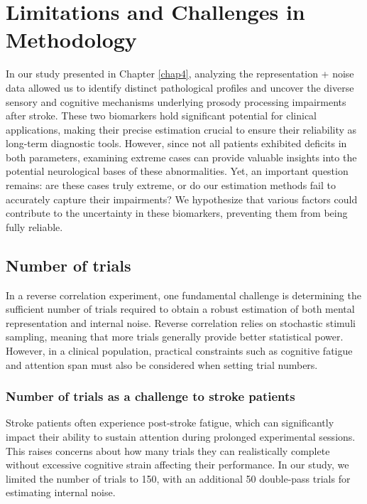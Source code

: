 \renewcommand{\chaptername}{Chapter} 
\chapter{Limitations and Challenges in Methodology}\label{chap5}

In our study presented in Chapter \ref{chap4}, analyzing the representation + noise data allowed us to identify distinct pathological profiles and uncover the diverse sensory and cognitive mechanisms underlying prosody processing impairments after stroke. These two biomarkers hold significant potential for clinical applications, making their precise estimation crucial to ensure their reliability as long-term diagnostic tools. However, since not all patients exhibited deficits in both parameters, examining extreme cases can provide valuable insights into the potential neurological bases of these abnormalities. Yet, an important question remains: are these cases truly extreme, or do our estimation methods fail to accurately capture their impairments? We hypothesize that various factors could contribute to the uncertainty in these biomarkers, preventing them from being fully reliable.


\section {Number of trials}
In a reverse correlation experiment, one fundamental challenge is determining the sufficient number of trials required to obtain a robust estimation of both mental representation and internal noise.  Reverse correlation relies on stochastic stimuli sampling, meaning that more trials generally provide better statistical power. However, in a clinical population, practical constraints such as cognitive fatigue and attention span must also be considered when setting trial numbers.

\subsection{Number of trials as a challenge to stroke patients}
Stroke patients often experience post-stroke fatigue, which can significantly impact their ability to sustain attention during prolonged experimental sessions. This raises concerns about how many trials they can realistically complete without excessive cognitive strain affecting their performance. In our study, we limited the number of trials to 150, with an additional 50 double-pass trials for estimating internal noise.

